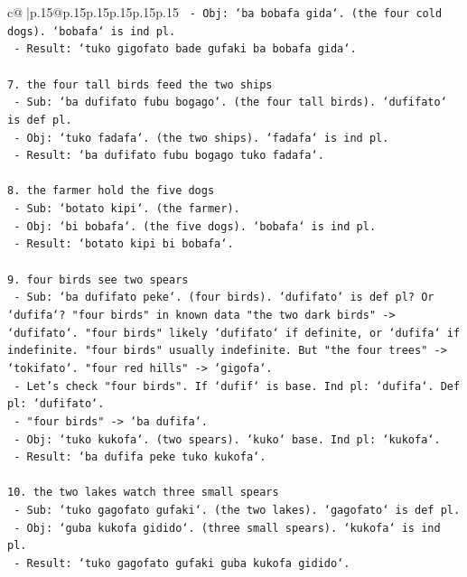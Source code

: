 \documentclass{article}
\begin{document}
{\begin{supertabular}{c@{$\;$}|p{.15\linewidth}@{}p{.15\linewidth}p{.15\linewidth}p{.15\linewidth}p{.15\linewidth}p{.15\linewidth}}
{{{\texttt{   {-} Obj: `ba bobafa gida`. (the four cold dogs). `bobafa` is ind pl.} \\
\texttt{   {-} Result: `tuko gigofato bade gufaki ba bobafa gida`.} \\
\\ 
\texttt{7. the four tall birds feed the two ships} \\
\texttt{   {-} Sub: `ba dufifato fubu bogago`. (the four tall birds). `dufifato` is def pl.} \\
\texttt{   {-} Obj: `tuko fadafa`. (the two ships). `fadafa` is ind pl.} \\
\texttt{   {-} Result: `ba dufifato fubu bogago tuko fadafa`.} \\
\\ 
\texttt{8. the farmer hold the five dogs} \\
\texttt{   {-} Sub: `botato kipi`. (the farmer).} \\
\texttt{   {-} Obj: `bi bobafa`. (the five dogs). `bobafa` is ind pl.} \\
\texttt{   {-} Result: `botato kipi bi bobafa`.} \\
\\ 
\texttt{9. four birds see two spears} \\
\texttt{   {-} Sub: `ba dufifato peke`. (four birds). `dufifato` is def pl? Or `dufifa`? "four birds" in known data "the two dark birds" {-}> `dufifato`. "four birds" likely `dufifato` if definite, or `dufifa` if indefinite. "four birds" usually indefinite. But "the four trees" {-}> `tokifato`. "four red hills" {-}> `gigofa`.} \\
\texttt{   {-} Let's check "four birds". If `dufif` is base. Ind pl: `dufifa`. Def pl: `dufifato`.} \\
\texttt{   {-} "four birds" {-}> `ba dufifa`.} \\
\texttt{   {-} Obj: `tuko kukofa`. (two spears). `kuko` base. Ind pl: `kukofa`.} \\
\texttt{   {-} Result: `ba dufifa peke tuko kukofa`.} \\
\\ 
\texttt{10. the two lakes watch three small spears} \\
\texttt{    {-} Sub: `tuko gagofato gufaki`. (the two lakes). `gagofato` is def pl.} \\
\texttt{    {-} Obj: `guba kukofa gidido`. (three small spears). `kukofa` is ind pl.} \\
\texttt{    {-} Result: `tuko gagofato gufaki guba kukofa gidido`.} \\
}}}
\end{supertabular}}
\end{document}
